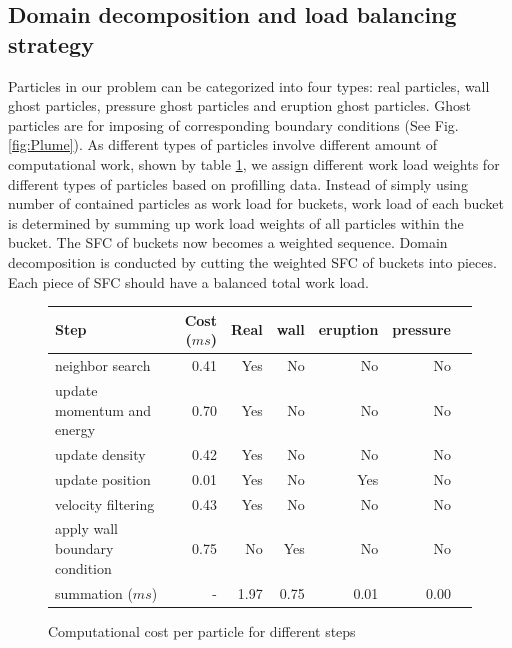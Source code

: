 \documentclass[procedia]{easychair}
\begin{document}
\subsection{Domain decomposition and load balancing strategy}
\label{sect:load_balance}
Particles in our problem can be categorized into four types: real particles, wall ghost particles, pressure ghost particles and eruption ghost particles. Ghost particles are for imposing of corresponding boundary conditions (See Fig. \ref{fig:Plume}). As different types of particles involve different amount of computational work, shown by table \ref{tab:Computational_cost_steps}, we assign different work load weights for different types of particles based on profilling data. Instead of simply using number of contained particles as work load for buckets, work load of each bucket is determined by summing up work load weights of all particles within the bucket. The SFC of buckets now becomes a weighted sequence. Domain decomposition  is conducted by cutting the weighted SFC of buckets into pieces. Each piece of SFC should have a balanced total work load.
\begin{figure}
\CenterFloatBoxes
\ttabbox
{	  
	  \begin{tabular}{lrrrrrr}
	    \hline
	    Step & Cost ($ms$) & Real & wall & eruption & pressure\\
	    \hline
	    neighbor search & 0.41 & Yes & No & No & No \\
	    update momentum and energy & 0.70 & Yes & No & No & No\\
	    update density & 0.42 & Yes & No & No & No \\
	    update position & 0.01 & Yes & No & Yes &  No\\
	    velocity filtering& 0.43 & Yes & No & No & No\\
	    apply wall boundary condition     & 0.75 & No & Yes & No & No\\
	    summation ($ms$) & - & 1.97 & 0.75 & 0.01 & 0.00\\
	    \hline
	  \end{tabular}
}
{\caption{Computational cost per particle for different steps}	}
\label{tab:Computational_cost_steps}
\end{figure}
\end{document}
